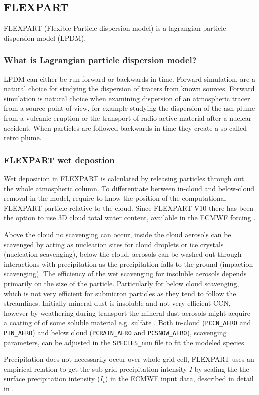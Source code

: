 
\subsection{FLEXPART}
FLEXPART (Flexible Particle dispersion model) is a lagrangian particle dispersion model (LPDM). 

\subsubsection{What is Lagrangian particle dispersion model?}
LPDM can either be run forward or backwards in time. Forward simulation, are a
natural choice for studying the dispersion of tracers from known sources.
Forward simulation is natural choice when examining dispersion of an atmospheric
tracer from a source point of view, for example studying the dispersion of the
ash plume from a vulcanic eruption or the transport of radio active material
after a nuclear accident. When particles are followed backwards in time they create a so 
called retro plume. 
\subsubsection{FLEXPART wet depostion}
Wet deposition in FLEXPART is calculated by releasing particles through out the
whole atmospheric column. To differentiate between in-cloud and below-cloud
removal in the model, require to know the position of the computational FLEXPART
particle relative to the cloud. Since FLEXPART V10 there has been the option to
use 3D cloud total water content, available in the ECMWF forcing
\parencite{flexpart_wetdep}.  

Above the cloud no scavenging can occur, inside the cloud aerosols can be
scavenged by acting as nucleation sites for cloud droplets or
ice crystals (nucleation scavenging), below the cloud, aerosols can be washed-out
through interactions with precipitation as the precipitation falls to the ground
(impaction scavenging). The efficiency of the wet scavenging for insoluble aerosols 
depends primarily on the size of the particle. Particularly for below cloud 
scavenging, which is not very efficient for submicron particles as they tend to
follow the streamlines. Initially mineral dust is insoluble and not very efficient CCN,
however by weathering during transport the mineral dust aerosols might acquire a coating of
of some soluble material e.g. sulfate \textcite{Dust_aerosols_coating2001}. Both in-cloud
(\verb|PCCN_AERO| and \verb|PIN_AERO|) and below cloud (\verb|PCRAIN_AERO| and \verb|PCSNOW_AERO|),  
scavenging parameters, can be adjusted in the \verb|SPECIES_nnn| file to fit the
modeled species.     

Precipitation does not necessarily occur over whole grid cell,
FLEXPART uses an empirical relation to get the sub-grid precipitation intensity
$ I $ by scaling the  the surface precipitation intensity ($ I_t $) in the ECMWF
input data, described in detail in \textcite{Flexpart-2005_ref_paper}.   

